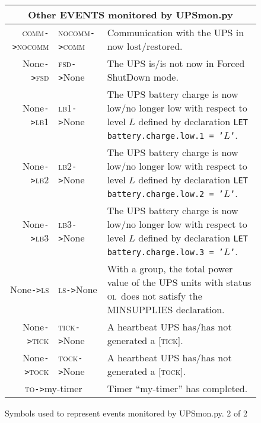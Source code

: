\documentclass[12pt]{article}
\newcommand{\UPSmon}{\mbox{\textcolor{UPSMONCOLOUR}{UPSmon.py}}}
\newcommand{\LBi}{\textcolor{MONCOLOUR}{\textsc{lb1}}}
\newcommand{\LBii}{\textcolor{MONCOLOUR}{\textsc{lb2}}}
\newcommand{\LBiii}{\textcolor{MONCOLOUR}{\textsc{lb3}}}
\newcommand{\OL}{\textcolor{UPSDCOLOUR}{\textsc{ol}}}
\newcommand{\NOCOMM}{\textcolor{MONCOLOUR}{\textsc{nocomm}}}
\newcommand{\COMM}{\textcolor{UPSMONCOLOUR}{\textsc{comm}}}
\newcommand{\FSD}{\textcolor{UPSMONCOLOUR}{\textsc{fsd}}}
\newcommand{\LS}{\textcolor{UPSMONCOLOUR}{\textsc{ls}}}
\newcommand{\None}{\textcolor{UPSMONCOLOUR}{\textsf{None}}}
\newcommand{\TICK}{\textcolor{UPSMONCOLOUR}{\textsc{tick}}}
\newcommand{\TO}{\textcolor{UPSMONCOLOUR}{\textsc{to}}}
\newcommand{\TOCK}{\textcolor{UPSMONCOLOUR}{\textsc{tock}}}
\newcommand{\status}[1]{\textcolor{UPSDCOLOUR}{[{#1}]}}
\newcommand{\EVENT}[2]{\textcolor{MONCOLOUR}{#1}{\allowbreak}\texttt{\textcolor{MONCOLOUR}{->}}{\allowbreak}\textcolor{MONCOLOUR}{#2}}
\begin{document}
\begin{figure}[ht]
\begin{center}
\begin{tabular}{|r|l|p{0.65\LinePrinterwidth}|}
\hline
\multicolumn{3}{|c|}{Other EVENTS monitored by \UPSmon} \\ \hline
\EVENT{\COMM}{\NOCOMM}  & \EVENT{\NOCOMM}{\COMM}   & Communication with the UPS in now lost/restored. \\ \hline
\EVENT{\None}{\FSD}     & \EVENT{\FSD}{\None}      & The UPS is/is not now in Forced ShutDown mode. \\ \hline
\EVENT{\None}{\LBi}     & \EVENT{\LBi}{\None}      & The UPS battery charge is now low/no longer 
                                                     low with respect to level $L$ defined by declaration
                                                     \texttt{LET battery.charge.low.1 = '}$L$\texttt{'}. \\ \hline
\EVENT{\None}{\LBii}    & \EVENT{\LBii}{\None}     & The UPS battery charge is now low/no longer 
                                                     low with respect to level $L$ defined by declaration
                                                     \texttt{LET battery.charge.low.2 = '}$L$\texttt{'}. \\ \hline
\EVENT{\None}{\LBiii}   & \EVENT{\LBiii}{\None}    & The UPS battery charge is now low/no longer
                                                     low with respect to level $L$ defined by declaration
                                                     \texttt{LET battery.charge.low.3 = '}$L$\texttt{'}. \\ \hline
\EVENT{\None}{\LS}      & \EVENT{\LS}{\None}       & With a group, the total power value of the UPS units
                                                     with status \OL\ does
                                                     not satisfy the MINSUPPLIES declaration. \\ \hline
\EVENT{\None}{\TICK}    & \EVENT{\TICK}{\None}     & A heartbeat UPS has/has not generated a \status{\TICK}. \\ \hline
\EVENT{\None}{\TOCK}    & \EVENT{\TOCK}{\None}     & A heartbeat UPS has/has not generated a \status{\TOCK}. \\ \hline
\multicolumn{2}{|c|}{\EVENT{\TO}{my-timer}}        & Timer ``my-timer'' has completed. \\ \hline
\end{tabular}
\caption{Symbols used to represent events monitored by \UPSmon.  2 of 2\label{fig:UPSmonEVENT}}
\end{center}
\end{figure}
\end{document}
